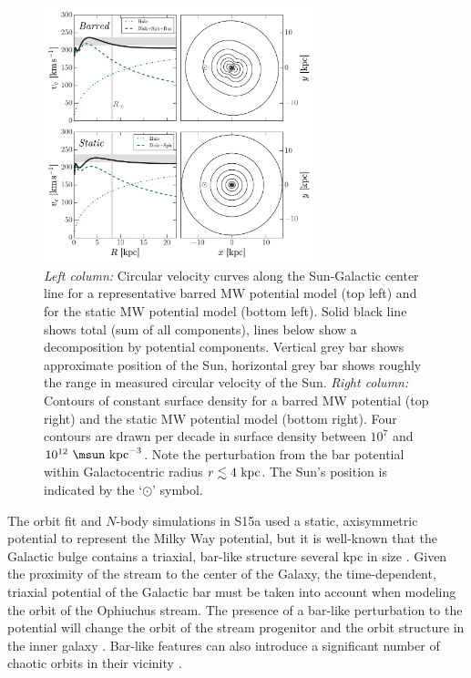 \documentclass[letterpaper,12pt,preprint]{aastex}
\begin{document}
\begin{figure}[!tbp]
\begin{center}
\includegraphics[width=0.7\textwidth]{figures/potentials-four}
\caption{{\it Left column:} Circular velocity curves along the Sun-Galactic center line for a representative barred MW potential model (top left) and for the static MW potential model (bottom left). Solid black line shows total (sum of all components), lines below show a decomposition by potential components. Vertical grey bar shows approximate position of the Sun, horizontal grey bar shows roughly the range in measured circular velocity of the Sun. {\it Right column:} Contours of constant surface density for a barred MW potential (top right) and the static MW potential model (bottom right). Four contours are drawn per decade in surface density between $10^7$ and $10^{12}~\msun~{\rm kpc}^{-3}$. Note the perturbation from the bar potential within Galactocentric radius $r \lesssim 4~{\rm kpc}$. The Sun's position is indicated by the `$\odot$' symbol. }
\label{fig:potentials}
\end{center}
\end{figure}

The orbit fit and $N$-body simulations in S15a used a static, axisymmetric potential to represent the Milky Way potential, but it is well-known that the Galactic bulge contains a triaxial, bar-like structure several kpc in size \citep[e.g.,][]{blitz91, weinberg92, dwek95, wegg13}. Given the proximity of the stream to the center of the Galaxy, the time-dependent, triaxial potential of the Galactic bar must be taken into account when modeling the orbit of the Ophiuchus stream. The presence of a bar-like perturbation to the potential will change the orbit of the stream progenitor and the orbit structure in the inner galaxy \citep{zotos12, portail15b, gajda15}. Bar-like features can also introduce a significant number of chaotic orbits in their vicinity \citep{weinberg15}.
\end{document}
